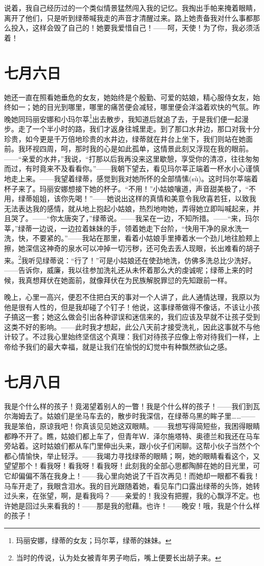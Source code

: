 \documentclass[12pt,oneside]{book}
\begin{document}
说着，我自己经历过的一个类似情景猛然闯入我的记忆。我掏出手帕来掩着眼睛，离开了他们，只是听到绿蒂喊我走的声音才清醒过来。路上她责备我对什么事都那么投入，这样会毁了自己的！她要我爱惜自己！——呵，天使！为了你，我必须活着！

\chapter{七月六日}
她还一直在照看她垂危的女友，她始终是个殷勤、可爱的姑娘，精心服侍女友，始终如一；她的目光到哪里，哪里的痛苦便会减轻，哪里便会洋溢着欢快的气氛。昨晚她同玛丽安娜和小玛尔莘\footnote{玛丽安娜，绿蒂的女友；玛尔莘，绿蒂的妹妹。}出去散步，我知道后就追了去，于是我们便一起漫步。走了一个半小时的路，我们才返身往城里走。到了那口水井边，那口对我十分珍贵，如今更是千万倍地珍贵的水井边，绿蒂就在井台上坐下，我们则站在她面前。我环视四周，呵，那时我的心是如此孤单，这情景此刻又浮现在我的眼前。——“亲爱的水井，”我说，“打那以后我再没来这里歇憩，享受你的清凉，往往匆匆而过，有时竟来不及看看你。”——我朝下望去，看见玛尔莘正端着一杯水小心谨慎地走上来。——我望着绿蒂，感觉到我对她所怀的全部情愫(sù)。这时玛尔莘端着杯子来了。玛丽安娜想接下她的杯子。“不用！”小姑娘嚷道，声音甜美极了，“不用，绿蒂姐姐，该你先喝！”——她说出这样的真情和美意令我欣喜若狂，以致我无法表达我的感情，就从地上抱起小姑娘，热烈地吻她，弄得她立即叫喊起来，并且哭了。——“你太唐突了，”绿蒂说。——我呆在一边，不知所措。——“来，玛尔莘，”绿蒂一边说，一边拉着妹妹的手，领着她走下台阶，“快用干净的泉水洗一洗，快，不要紧的。”——我站在那里，看着小姑娘手里捧着水一个劲儿地往脸颊上擦，她深信这神奇的泉水可以冲掉一切污秽，还可免去丢人现眼，长出难看的胡子来。\footnote{当时的传说，认为处女被青年男子吻后，嘴上便要长出胡子来。}我听见绿蒂说：“行了！”可是小姑娘还在使劲地洗，仿佛多洗总比少洗好。——告诉你，威廉，我以往参加洗礼还从未怀着那么大的虔诚呢；绿蒂上来的时候，我真想拜伏在她面前，就像拜伏在为民族解脱罪愆的先知跟前一样。

晚上，心里一高兴，便忍不住把白天的事对一个人讲了，此人通情达理，我原以为他是很有人性的，但是我却碰了个钉子！他说，这事绿蒂做得不像话，不该让小孩子搞这一套；她这么做会引出各种谬误和迷信来的，我们应该及早就不让孩子受到这类不好的影响。——此时我才想起，此公八天前才接受洗礼，因此这事就不与他计较了。不过我心里始终坚信这个真理：我们对待孩子应像上帝对待我们一样，上帝给予我们的最大幸福，就是让我们在愉悦的幻觉中有种飘然欲仙之感。


\chapter{七月八日}
我是个什么样的孩子！竟渴望着别人的一瞥！我是个什么样的孩子！——我们到瓦尔海姆去了。姑娘们是坐马车去的，散步时我深信，在绿蒂乌黑的眸子里……——我是笨伯，原谅我吧！你真该见见她这双眼睛。——我想写得简短些，我困得眼睛都睁不开了。瞧，姑娘们都上车了，但青年Ｗ．泽尔施塔特、奥德兰和我还在马车旁站着。这时姑娘们都从车门里伸出头来，跟小伙子们闲聊。这帮小伙子当然个个都心情愉快，举止轻浮。——我竭力寻找绿蒂的眼睛；啊，她的眼睛看看这个，又望望那个！看我呀！看我呀！看我呀！此刻我的全部心思都陶醉在她的目光里，可它却偏偏不落在我身上！——我心里向她说了千百次再见！而她却一眼都不看我！马车开走了，我眼含泪水。我的目光跟随着她，看见车门口露出绿蒂的头饰，她转过头来，在张望，啊，是看我吗？——亲爱的！我没有把握，我的心飘浮不定。也许她是回过头来看我的！——那是我的慰藉。也许！——晚安！哦，我是个什么样的孩子！
\end{document}
